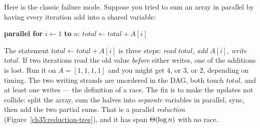 \begin{trapbox}
Here is the classic failure mode. Suppose you tried to sum an array in parallel by
having every iteration add into a shared variable:
\begin{center}
\textbf{parallel for} $i \gets 1$ \textbf{to} $n$: \quad $total \gets total + A[i]$
\end{center}
The statement $total \gets total + A[i]$ is three steps: \emph{read} $total$,
\emph{add} $A[i]$, \emph{write} $total$. If two iterations read the old value
\emph{before} either writes, one of the additions is lost. Run it on $A=[1,1,1,1]$
and you might get $4$, or $3$, or $2$, depending on timing. The two writing
strands are unordered in the DAG, both touch $total$, and at least one writes ---
the definition of a race. The fix is to make the updates not collide: split the
array, sum the halves into \emph{separate} variables in parallel, sync, then add
the two partial sums. That is a parallel \emph{reduction}
(Figure~\ref{ch35:reduction-tree}), and it has span $\Theta(\log n)$ with no race.
\end{trapbox}

